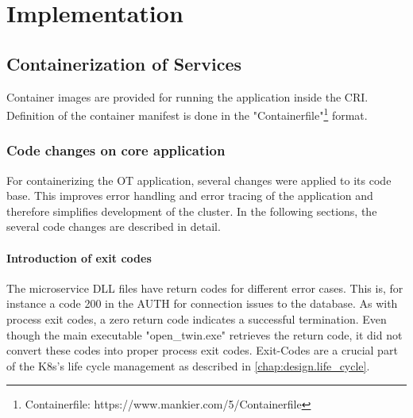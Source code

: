 \chapter{Implementation} %

\label{chap:implementation} %



\section{Containerization of Services}
Container images are provided for running the application inside the \ac{CRI}. Definition of the container manifest is done in the "Containerfile"\footnote{Containerfile: https://www.mankier.com/5/Containerfile} format.


\subsection{Code changes on core application}
For containerizing the \ac{OT} application, several changes were applied to its code base. This improves error handling and error tracing of the application and therefore simplifies development of the cluster. In the following sections, the several code changes are described in detail.

\subsubsection*{Introduction of exit codes}
The microservice \ac{DLL} files have return codes for different error cases. This is, for instance a code 200 in the \ac{AUTH} for connection issues to the database. As with process exit codes, a zero return code indicates a successful termination. Even though the main executable "open\_twin.exe" retrieves the return code, it did not convert these codes into proper process exit codes. 
Exit-Codes are a crucial part of the \ac{K8s}'s life cycle management as described in \autoref{chap:design.life_cycle}.

